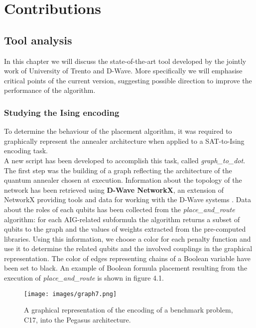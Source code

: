 \part{Contributions}

\chapter{Tool analysis}
\label{cha:analysis}

In this chapter we will discuss the state-of-the-art tool developed by the jointly work of University of Trento and D-Wave. More specifically we will emphasise critical points of the current version, suggesting possible direction to improve the performance of the algorithm.

\section{Studying the Ising encoding}

To determine the behaviour of the placement algorithm, it was required to graphically represent the annealer architecture when applied to a SAT-to-Ising encoding task. \\
A new script has been developed to accomplish this task, called \textit{graph\_to\_dot}. The first step was the building of a graph reflecting the architecture of the quantum annealer chosen at execution. Information about the topology of the network has been retrieved using \textbf{D-Wave NetworkX}, an extension of NetworkX providing tools and data for working with the D-Wave systems \cite{dwavenetx}. Data about the roles of each qubits has been collected from the \textit{place\_and\_route} algorithm: for each AIG-related subformula the algorithm returns a subset of qubits to the graph and the values of weights extracted from the pre-computed libraries. Using this information, we choose a color for each penalty function and use it to determine the related qubits and the involved couplings in the graphical representation. The color of edges representing chains of a Boolean variable have been set to black. 
An example of Boolean formula placement resulting from the execution of \textit{place\_and\_route} is shown in figure 4.1.

\begin{figure}[]
	\begin{center}
	\texttt{[image: images/graph7.png]}
	\caption{A graphical representation of the encoding of a benchmark problem, C17, into the Pegasus architecture.}
	\end{center}
\end{figure}

